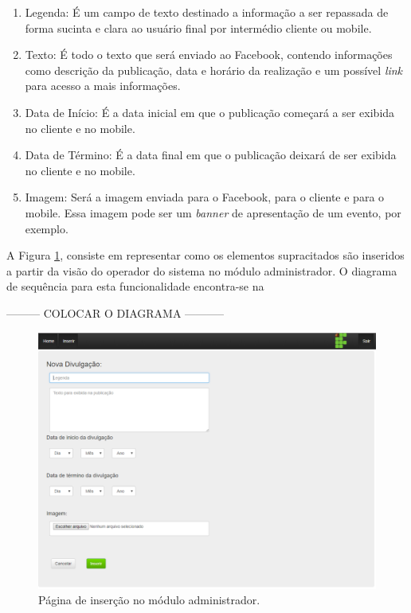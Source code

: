 \begin{enumerate}
   \item Legenda: É um campo de texto destinado a informação a ser repassada de forma sucinta e clara ao usuário final por intermédio cliente ou mobile. 
   \item Texto: É todo o texto que será enviado ao Facebook, contendo informações como descrição da publicação, data e horário da realização e um possível \textit{link} para acesso a mais informações. 
   \item Data de Início: É a data inicial em que o publicação começará a ser exibida no cliente e no mobile.
   \item Data de Término: É a data final em que o publicação deixará de ser exibida no cliente e no mobile.
   \item Imagem: Será a imagem enviada para o Facebook, para o cliente e para o mobile. Essa imagem pode ser um \textit{banner} de apresentação de um evento, por exemplo.
 \end{enumerate}

A Figura \ref{fig:administrador1}, consiste em representar como os elementos supracitados são inseridos a partir da visão do operador do sistema no módulo administrador. O diagrama de sequência para esta funcionalidade encontra-se na
 
 --------- COLOCAR O DIAGRAMA -----------

 
 \begin{figure}[H]
\centering
\includegraphics[scale=0.6]{figuras/administrador1}
\caption{Página de inserção no módulo administrador.}
\label{fig:administrador1}
\end{figure}

